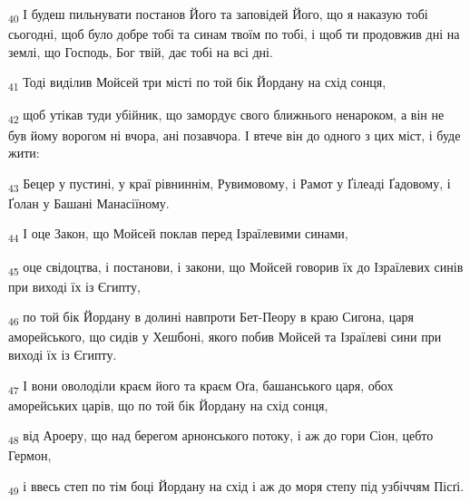 \begin{tcolorbox}
\textsubscript{40} І будеш пильнувати постанов Його та заповідей Його, що я наказую тобі сьогодні, щоб було добре тобі та синам твоїм по тобі, і щоб ти продовжив дні на землі, що Господь, Бог твій, дає тобі на всі дні.
\end{tcolorbox}
\begin{tcolorbox}
\textsubscript{41} Тоді виділив Мойсей три місті по той бік Йордану на схід сонця,
\end{tcolorbox}
\begin{tcolorbox}
\textsubscript{42} щоб утікав туди убійник, що замордує свого ближнього ненароком, а він не був йому ворогом ні вчора, ані позавчора. І втече він до одного з цих міст, і буде жити:
\end{tcolorbox}
\begin{tcolorbox}
\textsubscript{43} Бецер у пустині, у краї рівниннім, Рувимовому, і Рамот у Ґілеаді Ґадовому, і Ґолан у Башані Манасіїному.
\end{tcolorbox}
\begin{tcolorbox}
\textsubscript{44} І оце Закон, що Мойсей поклав перед Ізраїлевими синами,
\end{tcolorbox}
\begin{tcolorbox}
\textsubscript{45} оце свідоцтва, і постанови, і закони, що Мойсей говорив їх до Ізраїлевих синів при виході їх із Єгипту,
\end{tcolorbox}
\begin{tcolorbox}
\textsubscript{46} по той бік Йордану в долині навпроти Бет-Пеору в краю Сигона, царя аморейського, що сидів у Хешбоні, якого побив Мойсей та Ізраїлеві сини при виході їх із Єгипту.
\end{tcolorbox}
\begin{tcolorbox}
\textsubscript{47} І вони оволоділи краєм його та краєм Оґа, башанського царя, обох аморейських царів, що по той бік Йордану на схід сонця,
\end{tcolorbox}
\begin{tcolorbox}
\textsubscript{48} від Ароеру, що над берегом арнонського потоку, і аж до гори Сіон, цебто Гермон,
\end{tcolorbox}
\begin{tcolorbox}
\textsubscript{49} і ввесь степ по тім боці Йордану на схід і аж до моря степу під узбіччям Пісґі.
\end{tcolorbox}

